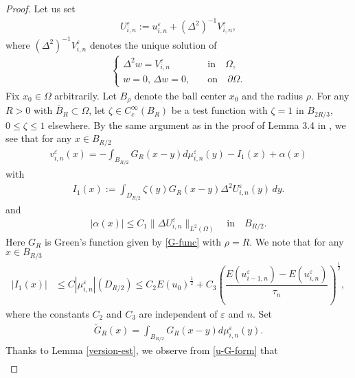 \documentclass[12pt]{amsart}
\begin{document}
\begin{proof}
Let us set 
\begin{align} \label{def-U}
U^{\varepsilon}_{i,n}:= u^{\varepsilon}_{i,n} + (\Delta^2)^{-1} V^{\varepsilon}_{i,n}, 
\end{align}
where $(\Delta^2)^{-1} V^{\varepsilon}_{i,n}$ denotes the unique solution of 
\begin{align*}
\begin{cases}
\Delta^2 w = V^{\varepsilon}_{i,n} \quad & \text{in} \quad \Omega, \\
w=0, \, \Delta w =0, \quad & \text{on} \quad {\partial} \Omega. 
\end{cases}
\end{align*}
Fix $x_0 \in \Omega$ arbitrarily. Let $B_\rho$ denote the ball center $x_0$ and the radius $\rho$. 
For any $R>0$ with ${\overline{{B}}}_R \subset \Omega$, let ${\zeta} \in C^{\infty}_c(B_R)$ be a test function with 
${\zeta}=1$ in $B_{2R/3}$, $0 \le {\zeta} \le 1$ elsewhere. 
By the same argument as in the proof of Lemma 3.4 in \cite{NO}, we see that for any $x \in B_{R/2}$ 
\begin{align} \label{u-G-form}
v^{\varepsilon}_{i,n}(x) = - \int_{B_{R/2}} G_R(x-y) d \mu^{\varepsilon}_{i,n}(y) 
  - I_1(x) + {\alpha}(x) 
\end{align}
with 
\begin{align*}
I_1(x) := \int_{D_{R/2}} {\zeta}(y) G_R(x-y) \Delta^2 U^{\varepsilon}_{i,n}(y) \, dy. 
\end{align*}
and 
\begin{align*}
{\left| {{\alpha}(x)} \right|} \le C_1 \| \Delta U^{\varepsilon}_{i,n} \|_{L^2(\Omega)} \quad \text{in} \quad B_{R/2}. 
\end{align*}
Here $G_R$ is Green's function given by \eqref{G-func} with $\rho=R$. 
We note that for any $x \in B_{R/3}$ 
\begin{align*}
{\left| {I_1(x)} \right|} & \le C {\left| {\mu^{\varepsilon}_{i,n}} \right|}(D_{R/2}) 
 \le C_2 E(u_0)^{\frac{1}{2}} + C_3 \left( \dfrac{E(u^{\varepsilon}_{i-1,n}) - E(u^{\varepsilon}_{i,n})}{\tau_n} \right)^{\frac{1}{2}}, 
\end{align*}
where the constants $C_2$ and $C_3$ are independent of ${\varepsilon}$ and $n$. 
Set 
\begin{align*}
\tilde{G}_{R}(x) = \int_{B_{R/2}} G_R(x-y) d \mu^{\varepsilon}_{i,n}(y). 
\end{align*}
Thanks to Lemma \ref{version-est}, we observe from \eqref{u-G-form} that  
\begin{align*}

\end{align*}
\end{proof}
\end{document}
